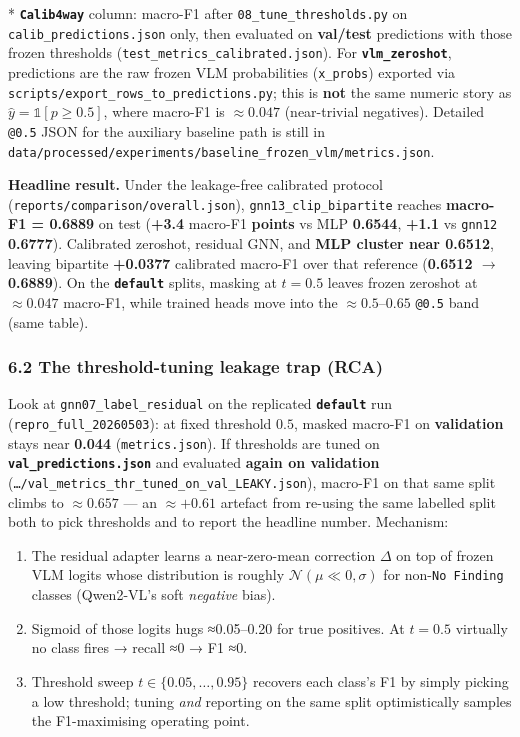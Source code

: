 \documentclass[
  11pt,
]{article}
\providecommand{\tightlist}{%
  \setlength{\itemsep}{0pt}\setlength{\parskip}{0pt}}
\begin{document}
* \textbf{\texttt{Calib4way}} column: macro-F1 after
\texttt{08\_tune\_thresholds.py} on \texttt{calib\_predictions.json}
only, then evaluated on \textbf{val/test} predictions with those frozen
thresholds (\texttt{test\_metrics\_calibrated.json}). For
\textbf{\texttt{vlm\_zeroshot}}, predictions are the raw frozen VLM
probabilities (\texttt{x\_probs}) exported via
\texttt{scripts/export\_rows\_to\_predictions.py}; this is \textbf{not}
the same numeric story as \(\hat{y}=\mathbb{1}[p\ge 0.5]\), where
macro-F1 is \(\approx 0.047\) (near-trivial negatives). Detailed
\texttt{@0.5} JSON for the auxiliary baseline path is still in
\texttt{data/processed/experiments/baseline\_frozen\_vlm/metrics.json}.

\textbf{Headline result.} Under the leakage-free calibrated protocol
(\texttt{reports/comparison/overall.json}),
\texttt{gnn13\_clip\_bipartite} reaches \textbf{macro-F1 = 0.6889} on
test (\textbf{+3.4} macro-F1 \textbf{points} vs MLP \textbf{0.6544},
\textbf{+1.1} vs \texttt{gnn12} \textbf{0.6777}). Calibrated zeroshot,
residual GNN, and \textbf{MLP cluster near 0.6512}, leaving bipartite
\textbf{+0.0377} calibrated macro-F1 over that reference (\textbf{0.6512
\(\rightarrow\) 0.6889}). On the \textbf{\texttt{default}} splits,
masking at \textbf{\(t=0.5\)} leaves frozen zeroshot at
\(\approx 0.047\) macro-F1, while trained heads move into the
\(\approx 0.5\text{--}0.65\) \texttt{@0.5} band (same table).

\subsubsection{6.2 The threshold-tuning leakage trap
(RCA)}\label{the-threshold-tuning-leakage-trap-rca}

Look at \texttt{gnn07\_label\_residual} on the replicated
\textbf{\texttt{default}} run (\texttt{repro\_full\_20260503}): at fixed
threshold \(0.5\), masked macro-F1 on \textbf{validation} stays near
\textbf{0.044} (\texttt{metrics.json}). If thresholds are tuned on
\textbf{\texttt{val\_predictions.json}} and evaluated \textbf{again on
validation} (\texttt{…/val\_metrics\_thr\_tuned\_on\_val\_LEAKY.json}),
macro-F1 on that same split climbs to \(\approx 0.657\) --- an
\(\approx +0.61\) artefact from re-using the same labelled split both to
pick thresholds and to report the headline number. Mechanism:

\begin{enumerate}
\def\labelenumi{\arabic{enumi}.}
\tightlist
\item
  The residual adapter learns a near-zero-mean correction \(\Delta\) on
  top of frozen VLM logits whose distribution is roughly
  \(\mathcal{N}(\mu\!\ll\!0, \sigma)\) for non-\texttt{No\ Finding}
  classes (Qwen2-VL's soft \emph{negative} bias).
\item
  Sigmoid of those logits hugs ≈0.05--0.20 for true positives. At
  \(t=0.5\) virtually no class fires → recall ≈0 → F1 ≈0.
\item
  Threshold sweep \(t\in\{0.05,\dots,0.95\}\) recovers each class's F1
  by simply picking a low threshold; tuning \emph{and} reporting on the
  same split optimistically samples the F1-maximising operating point.
\end{enumerate}
\end{document}
